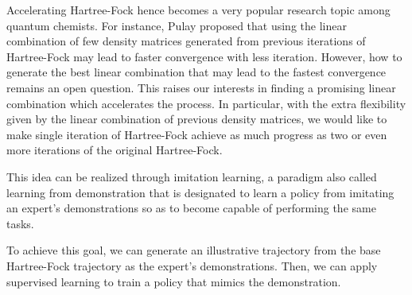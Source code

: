 \documentclass[twoside]{article}
\begin{document}

Accelerating Hartree-Fock hence becomes a very popular research topic among quantum chemists. For instance, Pulay \cite{Pulay1980} proposed that using the linear combination of few density matrices generated from previous iterations of Hartree-Fock may lead to faster convergence with less iteration. However, how to generate the best linear combination that may lead to the fastest convergence remains an open question. This raises our interests in finding a promising linear combination which accelerates the process. In particular, with the extra flexibility given by the linear combination of previous density matrices, we would like to make single iteration of Hartree-Fock achieve as much progress as two or even more iterations of the original Hartree-Fock.






This idea can be realized through imitation learning, a paradigm also called learning from demonstration that is designated to learn a policy from imitating an expert's demonstrations so as to become capable of performing the same tasks. 

To achieve this goal, we can generate an illustrative trajectory from the base Hartree-Fock trajectory as the expert's demonstrations. Then, we can apply supervised learning to train a policy that mimics the demonstration. 
\end{document}
